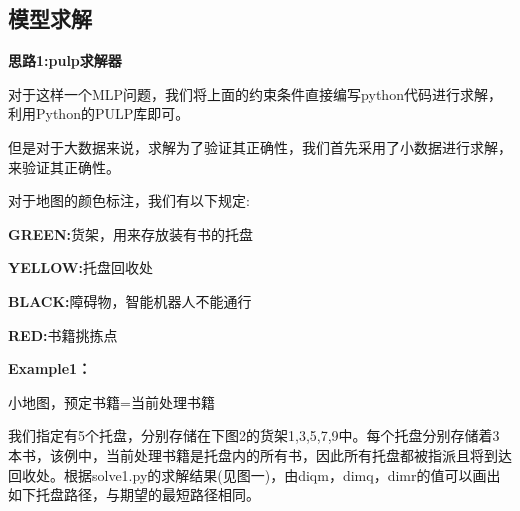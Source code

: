 \documentclass[withoutpreface,bwprint]{thesis-config}
\begin{document}
\newpage

\subsection{模型求解}
\par \textbf{思路1:pulp求解器}
\par 对于这样一个MLP问题，我们将上面的约束条件直接编写python代码进行求解，利用Python的PULP库即可。
\par 但是对于大数据来说，求解为了验证其正确性，我们首先采用了小数据进行求解，来验证其正确性。
\par 对于地图的颜色标注，我们有以下规定:
\par \quad \quad \quad \textbf{GREEN:}货架，用来存放装有书的托盘
\par \quad \quad \quad \textbf{YELLOW:}托盘回收处
\par \quad \quad \quad \textbf{BLACK:}障碍物，智能机器人不能通行
\par \quad \quad \quad \textbf{RED:}书籍挑拣点\newline



\par\textbf{ Example1：}

小地图，预定书籍=当前处理书籍
\par 我们指定有5个托盘，分别存储在下图2的货架1,3,5,7,9中。每个托盘分别存储着3本书，该例中，当前处理书籍是托盘内的所有书，因此所有托盘都被指派且将到达回收处。根据solve1.py的求解结果(见图一)，由diqm，dimq，dimr的值可以画出如下托盘路径，与期望的最短路径相同。
\end{document}
